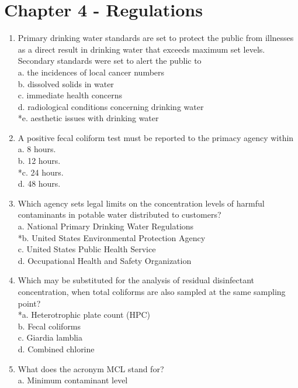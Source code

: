 \section{Chapter 4 - Regulations}
\begin{enumerate}[1.]
\item Primary drinking water standards are set to protect the public from illnesses as a direct result in drinking water that exceeds maximum set levels. Secondary standards were set to alert the public to\\
a. the incidences of local cancer numbers\\
b. dissolved solids in water\\
c. immediate health concerns\\
d. radiological conditions concerning drinking water\\
*e. aesthetic issues with drinking water\\
\item A positive fecal coliform test must be reported to the primacy agency within\\
a. 8 hours.\\
b. 12 hours.\\
*c. 24 hours.\\
d. 48 hours.\\
\item Which agency sets legal limits on the concentration levels of harmful contaminants in potable water distributed to customers?\\
a. National Primary Drinking Water Regulations\\
*b. United States Environmental Protection Agency\\
c. United States Public Health Service\\
d. Occupational Health and Safety Organization\\
\item Which may be substituted for the analysis of residual disinfectant concentration, when total coliforms are also sampled at the same sampling point?\\
*a. Heterotrophic plate count (HPC)\\
b. Fecal coliforms\\
c. Giardia lamblia\\
d. Combined chlorine\\
\item What does the acronym MCL stand for?\\
a. Minimum contaminant level\\

\end{enumerate}
